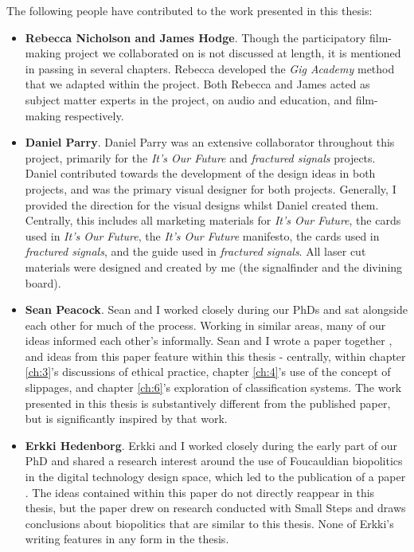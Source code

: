 \begin{publication}

The following people have contributed to the work presented in this thesis:
\begin{itemize}
    \item \textbf{Rebecca Nicholson and James Hodge}. Though the participatory film-making project we collaborated on is not discussed at length, it is mentioned in passing in several chapters. Rebecca  developed the \textit{Gig Academy} method that we adapted within the project. Both Rebecca and James acted as subject matter experts in the project, on audio and education, and film-making respectively. 
    \item \textbf{Daniel Parry}. Daniel Parry was an extensive collaborator throughout this project, primarily for the \textit{It's Our Future} and \textit{fractured signals} projects. Daniel contributed towards the development of the design ideas in both projects, and was the primary visual designer for both projects. Generally, I provided the direction for the visual designs whilst Daniel created them. Centrally, this includes all marketing materials for \textit{It's Our Future}, the cards used in \textit{It's Our Future}, the \textit{It's Our Future} manifesto, the cards used in \textit{fractured signals}, and the guide used in \textit{fractured signals}. All laser cut materials were designed and created by me (the signalfinder and the divining board).
    \item \textbf{Sean Peacock}. Sean and I worked closely during our PhDs and sat alongside each other for much of the process. Working in similar areas, many of our ideas informed each other's informally. Sean and I wrote a paper together \citep{cutting_making_2021}, and ideas from this paper feature within this thesis - centrally, within chapter \ref{ch:3}'s discussions of ethical practice, chapter \ref{ch:4}'s use of the concept of slippages, and chapter \ref{ch:6}'s exploration of classification systems. The work presented in this thesis is substantively different from the published paper, but is significantly inspired by that work.  
    \item \textbf{Erkki Hedenborg}. Erkki and I worked closely during the early part of our PhD and shared a research interest around the use of Foucauldian biopolitics in the digital technology design space, which led to the publication of a paper \citep{cutting_can_2019}. The ideas contained within this paper do not directly reappear in this thesis, but the paper drew on research conducted with Small Steps and draws conclusions about biopolitics that are similar to this thesis. None of Erkki's writing features in any form in the thesis. 

\end{itemize}
\end{publication}
